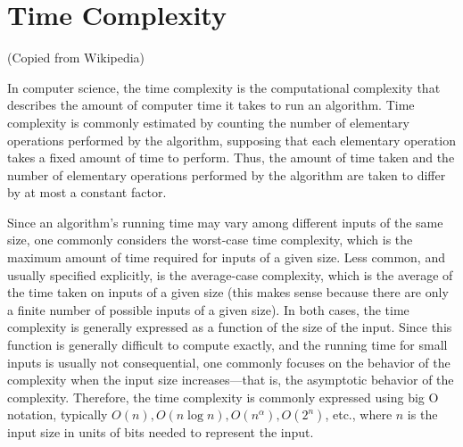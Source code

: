 \chapter{Time Complexity}

(Copied from Wikipedia)

In computer science, the time complexity is the computational complexity that describes the amount of computer time it takes to run an algorithm. Time complexity is commonly estimated by counting the number of elementary operations performed by the algorithm, supposing that each elementary operation takes a fixed amount of time to perform. Thus, the amount of time taken and the number of elementary operations performed by the algorithm are taken to differ by at most a constant factor.

Since an algorithm's running time may vary among different inputs of the same size, one commonly considers the worst-case time complexity, which is the maximum amount of time required for inputs of a given size. Less common, and usually specified explicitly, is the average-case complexity, which is the average of the time taken on inputs of a given size (this makes sense because there are only a finite number of possible inputs of a given size). In both cases, the time complexity is generally expressed as a function of the size of the input. Since this function is generally difficult to compute exactly, and the running time for small inputs is usually not consequential, one commonly focuses on the behavior of the complexity when the input size increases—that is, the asymptotic behavior of the complexity. Therefore, the time complexity is commonly expressed using big O notation, typically $O(n), O(n\log n), O(n^{\alpha }), O(2^{n})$, etc., where $n$ is the input size in units of bits needed to represent the input. \cite{herbst2021abstracting}

